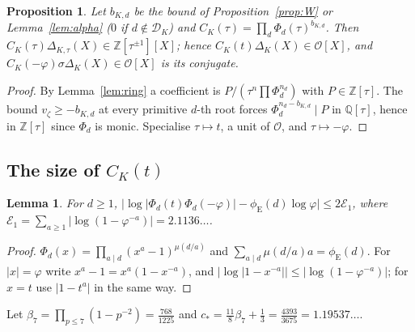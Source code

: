 \documentclass[11pt]{amsart}
\newtheorem{proposition}[theorem]{Proposition}
\newtheorem{lemma}[theorem]{Lemma}
\theoremstyle{definition}
\theoremstyle{remark}
\numberwithin{equation}{section}
\newcommand{\ZZ}{\mathbb{Z}}
\newcommand{\QQ}{\mathbb{Q}}
\newcommand{\cO}{\mathcal{O}}
\newcommand{\cD}{\mathcal{D}}
\newcommand{\eu}{\phi_{\mathrm E}}
\begin{document}
\begin{proposition}\label{prop:global}
Let $b_{K,d}$ be the bound of Proposition~\ref{prop:W} or Lemma~\ref{lem:alpha} \textup{(}$0$ if $d\notin\cD_K$\textup{)}
and $C_K(\tau)=\prod_d\Phi_d(\tau)^{b_{K,d}}$. Then $C_K(\tau)\Delta_{K,\tau}(X)\in\ZZ[\tau^{\pm1}][X]$; hence
$C_K(t)\Delta_K(X)\in\cO[X]$, and $C_K(-\varphi)\sigma\Delta_K(X)\in\cO[X]$ is its conjugate.
\end{proposition}
\begin{proof}
By Lemma~\ref{lem:ring} a coefficient is $P/(\tau^n\prod\Phi_d^{n_d})$ with $P\in\ZZ[\tau]$. The bound $v_\zeta\ge-b_{K,d}$
at every primitive $d$-th root forces $\Phi_d^{n_d-b_{K,d}}\mid P$ in $\QQ[\tau]$, hence in $\ZZ[\tau]$ since $\Phi_d$ is
monic. Specialise $\tau\mapsto t$, a unit of $\cO$, and $\tau\mapsto-\varphi$.
\end{proof}

\subsection{\texorpdfstring{The size of $C_K(t)$}{The size of C\_K(t)}}

\begin{lemma}\label{lem:phid}
For $d\ge1$, $\bigl|\log|\Phi_d(t)\Phi_d(-\varphi)|-\eu(d)\log\varphi\bigr|\le2\mathcal E_1$, where
$\mathcal E_1=\sum_{a\ge1}|\log(1-\varphi^{-a})|=2.1136\ldots$.
\end{lemma}
\begin{proof}
$\Phi_d(x)=\prod_{a\mid d}(x^a-1)^{\mu(d/a)}$ and $\sum_{a\mid d}\mu(d/a)a=\eu(d)$. For $|x|=\varphi$ write
$x^a-1=x^a(1-x^{-a})$, and $|\log|1-x^{-a}||\le|\log(1-\varphi^{-a})|$; for $x=t$ use $|1-t^a|$ in the same way.
\end{proof}

Let $\beta_7=\prod_{p\le7}(1-p^{-2})=\frac{768}{1225}$ and $c_*=\frac{11}8\beta_7+\frac13=\frac{4393}{3675}=1.19537\ldots$.
\end{document}
